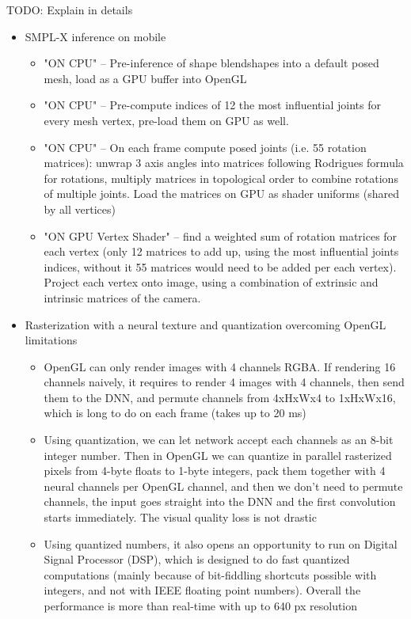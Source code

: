 \alert{TODO: Explain in details}
\begin{itemize}
	\item SMPL-X inference on mobile
	\begin{itemize}
		\item  "ON CPU" -- Pre-inference of shape blendshapes into a default posed mesh, load as a GPU buffer into OpenGL
		\item "ON CPU" -- Pre-compute indices of 12 the most influential joints for every mesh vertex, pre-load them on GPU as well.
		\item "ON CPU" -- On each frame compute posed joints (i.e. 55 rotation matrices): unwrap 3 axis angles into matrices following Rodrigues formula for rotations, multiply matrices in topological order to combine rotations of multiple joints. Load the matrices on GPU as shader uniforms (shared by all vertices)
		\item "ON GPU Vertex Shader" -- find a weighted sum of rotation matrices for each vertex (only 12 matrices to add up, using the most influential joints indices, without it 55 matrices would need to be added per each vertex). Project each vertex onto image, using a combination of extrinsic and intrinsic matrices of the camera.
	\end{itemize}
	\item Rasterization with a neural texture and quantization overcoming OpenGL limitations
	\begin{itemize}
		\item OpenGL can only render images with 4 channels RGBA. If rendering 16 channels naively, it requires to render 4 images with 4 channels, then send them to the DNN, and permute channels from 4xHxWx4 to 1xHxWx16, which is long to do on each frame (takes up to 20 ms)
		\item Using quantization, we can let network accept each channels as an 8-bit integer number. Then in OpenGL we can quantize in parallel rasterized pixels from 4-byte floats to 1-byte integers, pack them together with 4 neural channels per OpenGL channel, and then we don't need to permute channels, the input goes straight into the DNN and the first convolution starts immediately. The visual quality loss is not drastic
		\item Using quantized numbers, it also opens an opportunity to run on Digital Signal Processor (DSP), which is designed to do fast quantized computations (mainly because of bit-fiddling shortcuts possible with integers, and not with IEEE floating point numbers). Overall the performance is more than real-time with up to 640 px resolution

\end{itemize}
\end{itemize}
